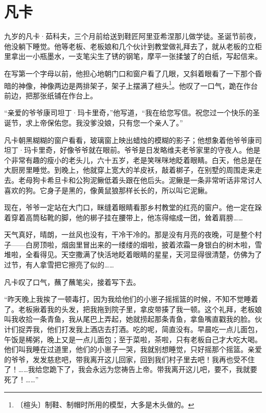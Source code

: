 \documentclass[12pt,UTF-8,openany]{ctexbook}
\begin{document}
\chapter{凡卡}

\begin{Large}
    
    九岁的凡卡·茹科夫，三个月前给送到鞋匠阿里亚希涅那儿做学徒。圣诞节前夜，他没躺下睡觉。他等老板、老板娘和几个伙计到教堂做礼拜去了，就从老板的立柜里拿出一小瓶墨水，一支笔尖生了锈的钢笔，摩平一张揉皱了的白纸，写起信来。
    
    在写第一个字母以前，他担心地朝门口和窗户看了几眼，又斜着眼看了一下那个昏暗的神像，神像两边是两排架子，架子上摆满了楦头\footnote{〔楦头〕制鞋、制帽时所用的模型，大多是木头做的。}。他叹了一口气，跪在作台前边，把那张纸铺在作台上。
    
    “亲爱的爷爷康司坦丁·玛卡里奇，”他写道，“我在给您写信。祝您过一个快乐的圣诞节，求上帝保佑您。我没爹没娘，只有您一个亲人了。”
    
    凡卡朝黑糊糊的窗户看看，玻璃窗上映出蜡烛的模糊的影子；他想象着他爷爷康司坦丁·玛卡里奇，好像爷爷就在眼前。爷爷是日发略维夫老爷家里的守夜人。他是个非常有趣的瘦小的老头儿，六十五岁，老是笑咪咪地眨着眼睛。白天，他总是在大厨房里睡觉。到晚上，他就穿上宽大的羊皮袄，敲着梆子，在别墅的周围走来走去。老母狗卡希旦卡和公狗泥鳅低着头跟在他后头。泥鳅是一条非常听话非常讨人喜欢的狗。它身子是黑的，像黄鼠狼那样长长的，所以叫它泥鳅。
    
    现在，爷爷一定站在大门口，眯缝着眼睛看那乡村教堂的红亮的窗户。他一定在跺着穿着高筒毡靴的脚，他的梆子挂在腰带上，他冻得缩成一团，耸着肩膀……
    
    天气真好，晴朗，一丝风也没有，干冷干冷的。那是没有月亮的夜晚，可是整个村子——白房顶啦，烟囱里冒出来的一缕缕的烟啦，披着浓霜一身银白的树木啦，雪堆啦，全看得见。天空撒满了快活地眨着眼睛的星星，天河显得很清楚，仿佛为了过节，有人拿雪把它擦亮了似的……
    
    凡卡叹了口气，蘸了蘸笔尖，接着写下去。
    
    “昨天晚上我挨了一顿毒打，因为我给他们的小崽子摇摇篮的时候，不知不觉睡着了。老板揪着我的头发，把我拖到院子里，拿皮带揍了我一顿。这个礼拜，老板娘叫我收拾一条青鱼，我从尾巴上弄起，她就捞起那条青鱼，拿鱼嘴直戳我的脸。伙计们捉弄我，他们打发我上酒店去打酒。吃的呢，简直没有。早晨吃一点儿面包，午饭是稀粥，晚上又是一点儿面包；至于菜啦，茶啦，只有老板自己才大吃大喝。他们叫我睡在过道里，他们的小崽子一哭，我就别想睡觉，只好摇那个摇篮。亲爱的爷爷，发发慈悲吧，带我离开这儿回家，回到我们村子里去吧！我再也受不住了！……我给您跪下了，我会永远为您祷告上帝。带我离开这儿吧，要不，我就要死了！……”
    

\end{Large}
\end{document}
